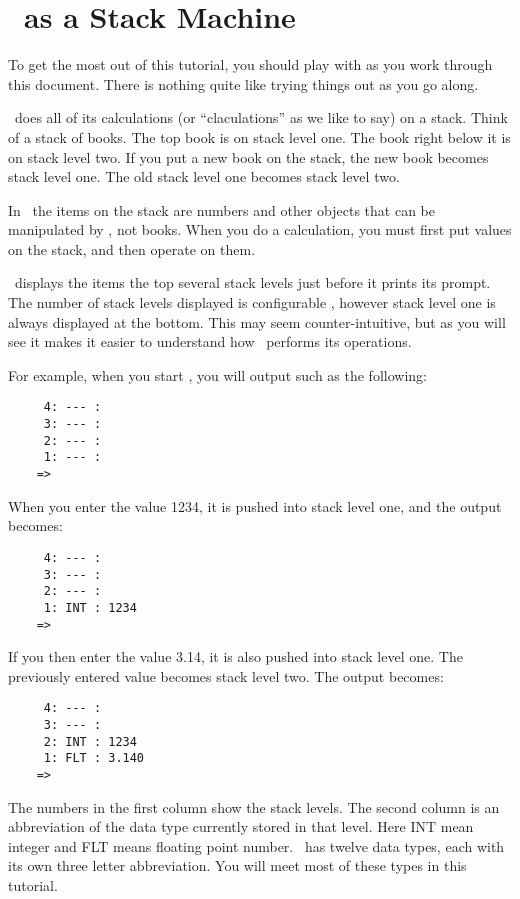 
\chapter{\CLAC\ as a Stack Machine}

To get the most out of this tutorial, you should play with \CLAC as you work through this
document. There is nothing quite like trying things out as you go along.

\CLAC\ does all of its calculations (or ``claculations'' as we like to say) on a stack. Think of
a stack of books. The top book is on stack level one. The book right below it is on stack level
two. If you put a new book on the stack, the new book becomes stack level one. The old stack
level one becomes stack level two.

In \CLAC\ the items on the stack are numbers and other objects that can be manipulated by \CLAC,
not books. When you do a calculation, you must first put values on the stack, and then operate
on them.

\CLAC\ displays the items the top several stack levels just before it prints its prompt. The
number of stack levels displayed is configurable , however stack
level one is always displayed at the bottom. This may seem counter-intuitive, but as you will
see it makes it easier to understand how \CLAC\ performs its operations.

For example, when you start \CLAC, you will output such as the following:

\begin{verbatim}
     4: --- : 
     3: --- : 
     2: --- : 
     1: --- : 
    => 
\end{verbatim}    

When you enter the value 1234, it is pushed into stack level one, and the output becomes:

\begin{verbatim}
     4: --- : 
     3: --- : 
     2: --- : 
     1: INT : 1234
    => 
\end{verbatim}    

If you then enter the value 3.14, it is also pushed into stack level one. The previously
entered value becomes stack level two. The output becomes:

\begin{verbatim}
     4: --- : 
     3: --- : 
     2: INT : 1234
     1: FLT : 3.140
    => 
\end{verbatim}

The numbers in the first column show the stack levels. The second column is an abbreviation of
the data type currently stored in that level. Here INT mean integer and FLT means floating point
number. \CLAC\ has twelve data types, each with its own three letter abbreviation. You will meet
most of these types in this tutorial.

